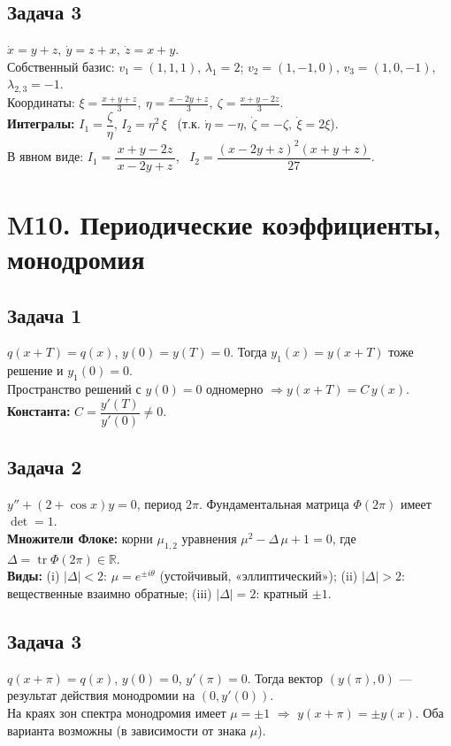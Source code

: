 \documentclass[12pt]{article}
\begin{document}
\subsection*{Задача 3}
$\dot x=y+z,\ \dot y=z+x,\ \dot z=x+y$. \\
Собственный базис: $v_1=(1,1,1)$, $\lambda_1=2$; $v_2=(1,-1,0)$, $v_3=(1,0,-1)$, $\lambda_{2,3}=-1$. \\
Координаты: $\xi=\frac{x+y+z}{3},\ \eta=\frac{x-2y+z}{3},\ \zeta=\frac{x+y-2z}{3}$. \\
\textbf{Интегралы: } $I_1=\dfrac{\zeta}{\eta}$, \quad $I_2=\eta^2\,\xi$ \ (т.к. $\dot\eta=-\eta,\ \dot\zeta=-\zeta,\ \dot\xi=2\xi$). \\
В явном виде: $I_1=\dfrac{x+y-2z}{\,x-2y+z\,}$, \ $I_2=\dfrac{(x-2y+z)^2(x+y+z)}{27}$.

\section*{M10. Периодические коэффициенты, монодромия}

\subsection*{Задача 1}
$q(x+T)=q(x)$, $y(0)=y(T)=0$. Тогда $y_1(x)=y(x+T)$ тоже решение и $y_1(0)=0$. \\
Пространство решений с $y(0)=0$ одномерно $\Rightarrow y(x+T)=C\,y(x)$. \\
\textbf{Константа: } $C=\dfrac{y'(T)}{y'(0)}\ne0$.

\subsection*{Задача 2}
$y''+(2+\cos x)y=0$, период $2\pi$. Фундаментальная матрица $\Phi(2\pi)$ имеет $\det=1$. \\
\textbf{Множители Флоке: } корни $\mu_{1,2}$ уравнения $\mu^2-\Delta\,\mu+1=0$, где $\Delta=\operatorname{tr}\Phi(2\pi)\in\mathbb{R}$. \\
\textbf{Виды: } 
(i) $|\Delta|<2$: $\mu=e^{\pm i\theta}$ (устойчивый, «эллиптический»); 
(ii) $|\Delta|>2$: вещественные взаимно обратные; 
(iii) $|\Delta|=2$: кратный $\pm1$.

\subsection*{Задача 3}
$q(x+\pi)=q(x)$, $y(0)=0$, $y'(\pi)=0$. Тогда вектор $(y(\pi),0)$ — результат действия монодромии на $(0,y'(0))$. \\
На краях зон спектра монодромия имеет $\mu=\pm1$ $\Rightarrow$ \textbf{$y(x+\pi)=\pm y(x)$}. Оба варианта возможны (в зависимости от знака \(\mu\)).
\end{document}
